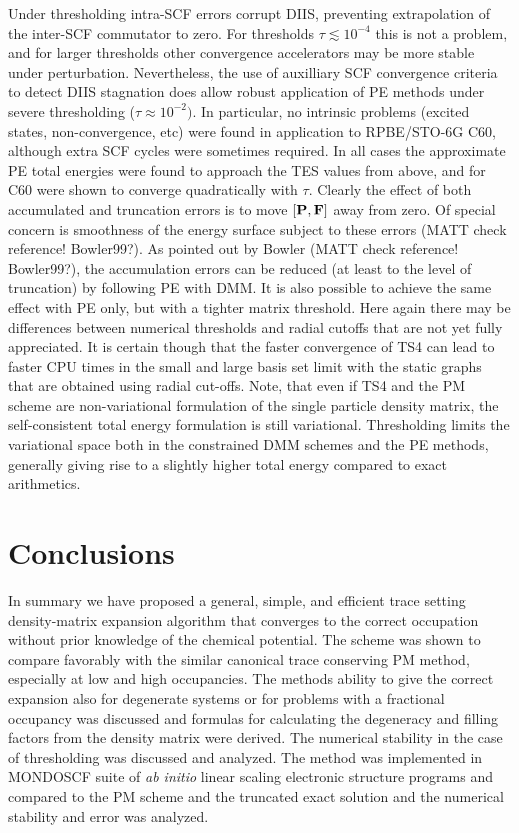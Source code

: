 \commentoutA{\documentclass[prb,aps,twocolumn,twocolumngrid,secnumarabic,superbib,hyperref]{revtex4}}
\begin{document}
{Under thresholding intra-SCF errors corrupt DIIS, preventing 
extrapolation of the inter-SCF commutator to zero.  For thresholds $\tau \lesssim 10^{-4}$
this is not a problem, and for larger thresholds other convergence 
accelerators may be more stable under perturbation.  Nevertheless,
the use of auxilliary SCF convergence criteria 
to detect DIIS stagnation does allow robust application of PE methods
under severe thresholding ($\tau \approx 10^{-2})$.
In particular, no intrinsic problems (excited states, non-convergence, etc) were
found in application to RPBE/STO-6G C60, although extra SCF cycles were sometimes required. 
In all cases the approximate PE total energies were found to approach the TES values
from above, and for C60 were shown to converge quadratically with $\tau$.
Clearly the effect of both accumulated and truncation errors is to move 
$[\bf P,F]$ away from zero.  Of special concern is smoothness
of the energy surface subject to these errors \cite{DBowler00} (MATT check reference! Bowler99?).  As pointed out by 
Bowler \cite{DBowler00} (MATT check reference! Bowler99?),  the accumulation errors can be reduced 
(at least to the level of truncation) by following PE with DMM. 
It is also possible to achieve the same effect with PE only, but with a tighter matrix threshold.  
Here again there may be differences between numerical thresholds and radial cutoffs 
that are not yet fully appreciated. It is certain though that the faster convergence of TS4 can 
lead to faster CPU times in the small and large basis set limit with the static graphs 
that are obtained using radial cut-offs. Note, that even if TS4 and the PM scheme are 
non-variational formulation of the single particle density matrix, the self-consistent
total energy formulation is still variational. Thresholding limits the variational space
both in the constrained DMM schemes and the PE methods, generally giving rise to a slightly
higher total energy compared to exact arithmetics.

\section{Conclusions}

In summary we have proposed a general, simple, and efficient 
trace setting density-matrix expansion algorithm that converges 
to the correct occupation without prior knowledge of the chemical
potential. The scheme was shown to compare favorably with the
similar canonical trace conserving PM method, especially at
low and high occupancies. The methods ability to give the
correct expansion also for degenerate systems or for problems
with a fractional occupancy was discussed
and formulas for calculating the degeneracy and filling factors
from the density matrix were derived. 
The numerical stability in the case of thresholding
was discussed and analyzed. The method was implemented in
MONDOSCF suite of {\it ab initio} linear scaling electronic structure
programs and compared to the PM scheme and the
truncated exact solution and the numerical stability
and error was analyzed.

}
\end{document}
